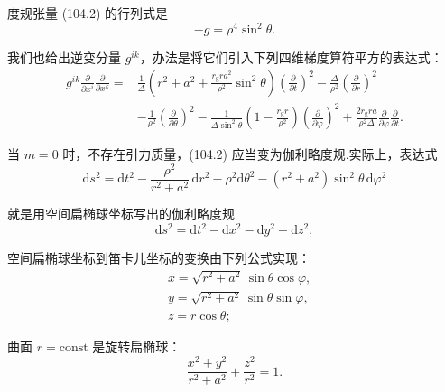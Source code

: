 度规张量 (104.2) 的行列式是
\begin{equation}
  -g=\rho^{4}\sin^{2}\theta.
\end{equation}

我们也给出逆变分量 $g^{ik}$，办法是将它们引入下列四维梯度算符平方的表达式：
\begin{equation}
\begin{aligned}
  g^{ik}\frac{\partial}{\partial x^{i}}
  \frac{\partial}{\partial x^{k}}
  ={}&\frac{1}{\varDelta}\left(r^{2}+a^{2}
  +\frac{r_{\mathrm{g}}ra^{2}}{\rho^{2}}\sin^{2}\theta\right)
  \left(\frac{\partial}{\partial t}\right)^{2}
  -\frac{\varDelta}{\rho^{2}}\left(\frac{\partial}{\partial r}\right)^{2}\\
  &-\frac{1}{\rho^{2}}\left(\frac{\partial}{\partial\theta}\right)^{2}
  -\frac{1}{\varDelta\sin^{2}\theta}
  \left(1-\frac{r_{\mathrm{g}}r}{\rho^{2}}\right)
  \left(\frac{\partial}{\partial\varphi}\right)^{2}
  +\frac{2r_{\mathrm{g}}ra}{\rho^{2}\varDelta}
  \frac{\partial}{\partial\varphi}\frac{\partial}{\partial t}.
\end{aligned}
\end{equation}

当 $m=0$ 时，不存在引力质量，(104.2) 应当变为伽利略度规.实际上，表达式
\begin{equation}
  \mathrm{d}s^{2}=\mathrm{d}t^{2}
  -\frac{\rho^{2}}{r^{2}+a^{2}}\,\mathrm{d}r^{2}
  -\rho^{2}\mathrm{d}\theta^{2}
  -(r^{2}+a^{2})\sin^{2}\theta\,\mathrm{d}\varphi^{2}
\end{equation}

就是用空间扁椭球坐标写出的伽利略度规
\begin{equation*}
  \mathrm{d}s^{2}=\mathrm{d}t^{2}-\mathrm{d}x^{2}-\mathrm{d}y^{2}-\mathrm{d}z^{2},
\end{equation*}

空间扁椭球坐标到笛卡儿坐标的变换由下列公式实现：
\begin{equation*}
\begin{aligned}
  &x=\sqrt{r^{2}+a^{2}}\,\sin\theta\cos\varphi,\\
  &y=\sqrt{r^{2}+a^{2}}\,\sin\theta\sin\varphi,\\
  &z=r\cos\theta;
\end{aligned}
\end{equation*}

曲面 $r=\mathrm{const}$ 是旋转扁椭球：
\begin{equation*}
  \frac{x^{2}+y^{2}}{r^{2}+a^{2}}+\frac{z^{2}}{r^{2}}=1.
\end{equation*}


